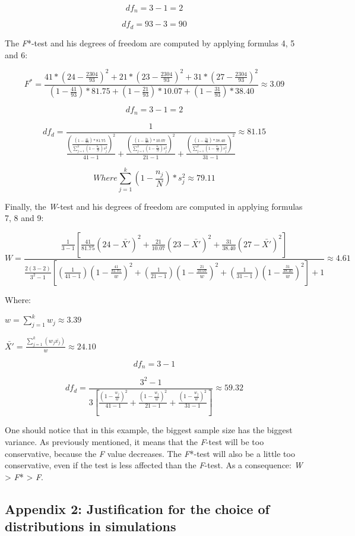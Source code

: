 \documentclass[man,floatsintext]{apa6}
\begin{document}
\begin{appendix}
\[
df_n=3-1=2
\]

\[
df_d=93-3=90
\]

The \emph{F}*-test and his degrees of freedom are computed by applying
formulas 4, 5 and 6:

\[
F^*=\frac{41*(24-\frac{2304}{93})^2+21*(23-\frac{2304}{93})^2+31*(27-\frac{2304}{93})^2}{(1-\frac{41}{93})*81.75+(1-\frac{21}{93})*10.07+(1-\frac{31}{93})*38.40} \approx 3.09
\]

\[
df_n=3-1=2
\]

\[
df_d=\frac{1}{\frac{(\frac{(1-\frac{41}{93})*81.75}{\sum_{j=1}^k(1-\frac{n_j}{N})s_j^2})^2}{41-1}+\frac{(\frac{(1-\frac{21}{93})*10.07}{\sum_{j=1}^k(1-\frac{n_j}{N})s_j^2})^2}{21-1}+\frac{(\frac{(1-\frac{31}{93})*38.40}{\sum_{j=1}^k(1-\frac{n_j}{N})s_j^2})^2}{31-1}} \approx 81.15
\]

\[ Where \sum_{j=1}^k(1-\frac{n_j}{N})*s_j^2 \approx 79.11\]

Finally, the \emph{W}-test and his degrees of freedom are computed in
applying formulas 7, 8 and 9:

\[
W=\frac{\frac{1}{3-1}[\frac{41}{81.75}(24-\bar{X'})^2+\frac{21}{10.07}(23-\bar{X'})^2+\frac{31}{38.40}(27-\bar{X'})^2]}
{\frac{2(3-2)}{3^2-1}[(\frac{1}{41-1})(1-\frac{\frac{41}{81.75}}{w})^2+(\frac{1}{21-1})(1-\frac{\frac{21}{10.07}}{w})^2+(\frac{1}{31-1})(1-\frac{\frac{31}{38.40}}{w})^2]+1} \approx 4.61
\]

Where:

\(w=\sum_{j=1}^k w_j \approx 3.39\)

\(\bar{X'}=\frac{\sum_{j=1}^k (w_j\bar{x_j})}{w} \approx 24.10\)

\[
df_n=3-1
\]

\[
df_d=\frac{3^2-1}{3[\frac{(1-\frac{w_j}{w})^2}{41-1}+\frac{(1-\frac{w_j}{w})^2}{21-1}+\frac{(1-\frac{w_j}{w})^2}{31-1}]} \approx 59.32
\]

One should notice that in this example, the biggest sample size has the
biggest variance. As previously mentioned, it means that the
\emph{F}-test will be too conservative, because the \emph{F} value
decreases. The \emph{F}*-test will also be a little too conservative,
even if the test is less affected than the \emph{F}-test. As a
consequence: \emph{W} \textgreater{} \emph{F}* \textgreater{} \emph{F}.

\hypertarget{appendix-2-justification-for-the-choice-of-distributions-in-simulations}{%
\subsection{Appendix 2: Justification for the choice of distributions in
simulations}\label{appendix-2-justification-for-the-choice-of-distributions-in-simulations}}


\end{appendix}
\end{document}
